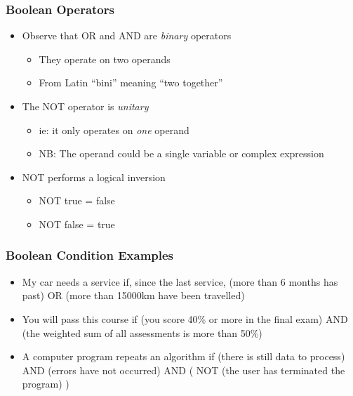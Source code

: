 \documentclass[14pt]{beamer}
\begin{document}
\begin{frame} %
\frametitle{Boolean Operators}
\begin{itemize}
\item Observe that OR and AND are \textit{binary} operators
	\begin{itemize}
		\item They operate on two operands
		\item From Latin ``bini'' meaning ``two together''
	\end{itemize}
\item The NOT operator is \textit{unitary}
	\begin{itemize}
		\item ie: it only operates on \textit{one} operand
		\item NB: The operand could be a single variable or complex expression
	\end{itemize}
\item NOT performs a logical inversion
	\begin{itemize}
		\item NOT true = false
		\item NOT false = true
	\end{itemize}
\end{itemize}
\end{frame}

\begin{frame} %
\frametitle{Boolean Condition Examples}

\begin{itemize}
	\item My car needs a service if, since the last service, (more than 6 months has past) OR (more than 15000km have been travelled)
	\item You will pass this course if (you score 40\% or more in the final exam) AND (the weighted sum of all assessments is more than 50\%)
	\item A computer program repeats an algorithm if (there is still data to process) AND (errors have not occurred) AND ( NOT (the user has terminated the program) )
\end{itemize}
\end{frame}
\end{document}
